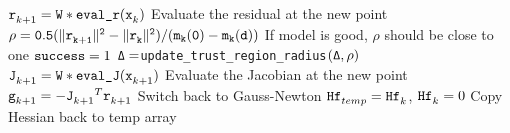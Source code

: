 \begin{algorithm}
\begin{algorithmic}[1]
        \State $\iter[k+1]{\tr} = {\tt W * \text{\tt eval\_r}}(\iter[k]{\tx})$
        \Comment Evaluate the residual at the new point
        \State $\rho = \tt 0.5 (\| \iter[k+1]{\tr} \|^2 - \| \iter[k]{\tr}\|^2)/(m_k(0) - m_k(\td)) $ 
        \Comment If model is good, $\rho$ should be close to one
          \State ${\tt success} = 1$
        \EndIf
        \State ${\tt \Delta = }${\tt update\_trust\_region\_radius}${\tt (\Delta,\rho)}$
      \EndWhile
      \State $\iter[k+1]{\tJ} = {\tt W * \text{\tt eval\_J}}(\iter[k+1]{\tx})$
      \Comment Evaluate the Jacobian at the new point
      \State $\iter[k+1]{\tg} = -{\iter[k+1]{\tJ}}^T\iter[k+1]{\tr}$
          \If { $\|\iter[k+1]{\tg}\| > \|\iter[k]{\tg} \| $}
          \Comment Switch back to Gauss-Newton
          \State ${\iter[temp]{\thess}} = \iter[k]{\thess}$, $\iter[k]{\thess} = 0$
          \Comment Copy Hessian back to temp array
          \EndIf
        \Else
  \end{algorithmic}
  
\end{algorithm}

